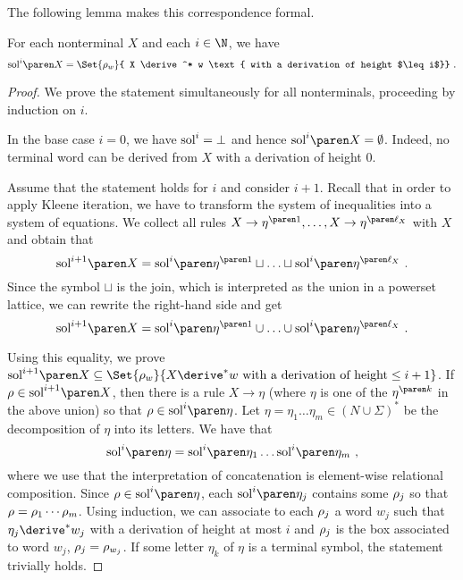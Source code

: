 \documentclass[../../diss.tex]{subfiles}
\begin{document}
The following lemma makes this correspondence formal.
\begin{lemma}%
\label{Lemma:EDSRegInclSoundnessHelper}%
    For each nonterminal $X$ and each $i \in \N$, we have
    \[
        \sol{i}{X}
        = \Set{ \tbox{w} }{ X \derive^* w \text{ with a derivation of height $\leq i$}}
        \ .
    \]
\end{lemma}

\begin{proof}
    We prove the statement simultaneously for all nonterminals, proceeding by induction on $i$.

    In the base case $i = 0$, we have $\text{sol}^{i} = \bot$ and hence $\sol{i}{X} = \emptyset$.
    Indeed, no terminal word can be derived from $X$ with a derivation of height $0$.

    Assume that the statement holds for $i$ and consider $i+1$.
    Recall that in order to apply Kleene iteration, we have to transform the system of inequalities into a system of equations.
    We collect all rules $X \to\itr{\eta}{1}, \ldots, X \to \itr{\eta}{\ell_X}$ with $X$ and obtain that
    \[
        \sol{i+1}{X} = \sol{i}{\itr{\eta}{1}} \sqcup \ldots \sqcup \sol{i}{\itr{\eta}{\ell_X}}
        \ .
    \]
    Since the symbol $\sqcup$ is the join, which is interpreted as the union in a powerset lattice, we can rewrite the right-hand side and get
    \[
        \sol{i+1}{X} = \sol{i}{\itr{\eta}{1}} \cup \ldots \cup \sol{i}{\itr{\eta}{\ell_X}}
        \ .
    \]

    Using this equality, we prove $\sol{i+1}{X} \subseteq \Set{ \tbox{w} }{ X \derive^* w \text{ with a derivation of height} \leq i+1}$.
    If $\tbox \in \sol{i+1}{X}$, then there is a rule $X \to \eta$ (where $\eta$ is one of the $\itr{\eta}{k}$ in the above union) so that $\tbox \in \sol{i}{\eta}$.
    Let $\eta = \eta_1 \ldots \eta_m \in {(N \cup \Sigma)}^*$ be the decomposition of $\eta$ into its letters.
    We have that
    \[
        \sol{i}{\eta} = \sol{i}{\eta_1}\ldots\sol{i}{\eta_m}
        \ ,
    \]
    where we use that the interpretation of concatenation is element-wise relational composition.
    Since $\tbox \in \sol{i}{\eta}$, each $\sol{i}{\eta_j}$ contains some $\tbox_j$ so that $\tbox = \tbox_1 \cdots \tbox_m$.
    Using induction, we can associate to each $\tbox_j$ a word $w_j$ such that $\eta_j \derive^* w_j$ with a derivation of height at most $i$ and $\tbox_j$ is the box associated to word $w_j$, $\tbox_j = \tbox{w_j}$.
    If some letter $\eta_k$ of $\eta$ is a terminal symbol, the statement trivially holds.


\end{proof}
\end{document}

